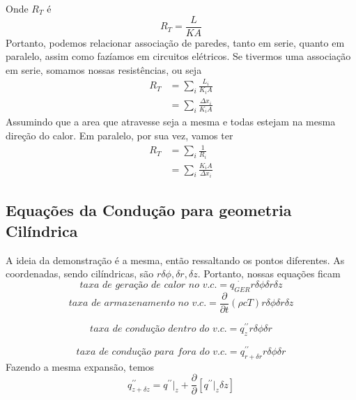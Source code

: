 Onde \(R_T\) é
\begin{equation}
    R_T = \frac{L}{KA}
\end{equation}
Portanto, podemos relacionar associação de paredes, tanto em serie, quanto em paralelo, assim como
fazíamos em circuitos elétricos. Se tivermos uma associação em serie, somamos nossas resistências,
ou seja
\begin{align}
    R_T &= \sum_{i} \frac{L_i}{K_i A}\\
    &= \sum_{i} \frac{\Delta x_i}{K_i A}
\end{align}
Assumindo que a area que atravesse seja a mesma e todas estejam na mesma direção do calor. Em
paralelo, por sua vez, vamos ter
\begin{align}
    R_T &= \sum_{i} \frac{1}{R_i}\\
    &= \sum_{i} \frac{K_i A}{\Delta x_i}
\end{align}
\subsection{Equações da Condução para geometria Cilíndrica}
A ideia da demonstração é a mesma, então ressaltando os pontos diferentes. As coordenadas, sendo
cilíndricas, são \(r \delta \phi, \delta r, \delta z\). Portanto, nossas equações ficam
\begin{equation}\label{eq: calor gerado v.c. cilindrica}
    \textit{taxa de geração de calor no v.c.}=\dot{q_{GER}}r \delta \phi \delta r \delta z
\end{equation}
\begin{equation}\label{eq: calor armazenado v.c. cilindrica}
    \textit{taxa de armazenamento no v.c.}=\frac{\partial}{\partial t}(\rho c T) r \delta \phi \delta r \delta z
\end{equation}

\begin{equation}\label{eq: taxa de conducao dentro v.c. cilindrica}
    \textit{taxa de condução dentro do v.c.}=q^{\prime \prime}_z r \delta \phi \delta r
\end{equation}

\begin{equation}\label{eq: taxa de conducao fora v.c. cilindrica}
    \textit{taxa de condução para fora do v.c.}= q^{\prime \prime}_{r + \delta r} r \delta \phi \delta r
\end{equation}
Fazendo a mesma expansão, temos
\begin{equation}
    q^{\prime \prime}_{z+\delta z}=q^{\prime \prime}|_z + \frac{\partial}{\partial}[q^{\prime \prime}|_z \delta z]
\end{equation}

